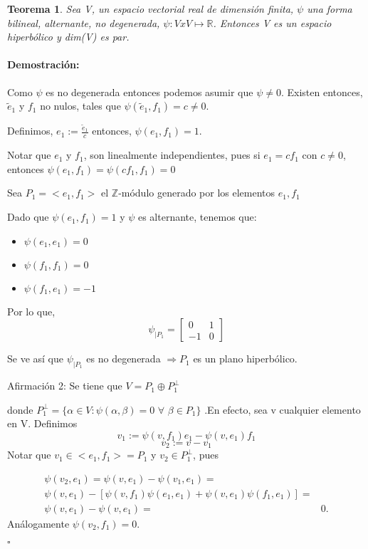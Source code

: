 \documentclass[12pt]{article}
\newtheorem{theorem}{Teorema}
\newenvironment{proof}{\paragraph{Demostración:}}{\hfill$\square$}
\begin{document}
\begin{theorem} \label{Lang-8.1}
 Sea V, un espacio vectorial real de dimensión finita, $\psi$ una forma bilineal, alternante, no degenerada, 
 $\psi:VxV\mapsto \mathbb{R}$. Entonces V es un espacio hiperbólico y dim(V) es par.
\end{theorem}

\begin{proof}
Como $\psi$ es no degenerada entonces podemos asumir que $\psi \neq 0$.
Existen entonces, $\tilde{e}_1$ y $f_1$ no nulos, tales que $\psi(\tilde{e}_1,f_1)=c\neq0$.

Definimos, $e_1:=\frac{\tilde{e}_1}{c}$ entonces, $\psi(e_1,f_1)=1$.

Notar que $e_1$ y $f_1$, son linealmente independientes, pues si $e_1=c f_1$ con $c\neq 0$,
entonces $\psi(e_1,f_1)=\psi(c f_1,f_1)=0$


Sea $P_1=<e_1,f_1>$ el $\mathbb{Z}$-módulo generado por los elementos $e_1,f_1$
    
Dado que $\psi(e_1,f_1)=1$ y $\psi$ es alternante, tenemos que:
\begin{itemize}
 \item $\psi(e_1,e_1)=0$
 \item $\psi(f_1,f_1)=0$
 \item $\psi(f_1,e_1)=-1$
\end{itemize}

Por lo que, 
$$\psi_{|P_1} = 
\begin{bmatrix}
 0 & 1\\ 
 -1& 0
\end{bmatrix}
$$

Se ve así que $\psi_{|P_1}$ es no degenerada $\Rightarrow P_1$ es un plano hiperbólico.
\newline

Afirmación 2: Se tiene que  $V = P_1 \oplus P_1^{\bot}$

 donde $P_1^{\bot}= \{ \alpha \in V: \psi(\alpha,\beta)=0$  $\forall$  $\beta \in P_1 \} $ .En efecto,  
 sea v cualquier elemento en V.
 Definimos 
 $$v_1:=\psi(v,f_1)e_1-\psi(v,e_1)f_1$$
 $$v_2:=v-v_1$$
 Notar que $v_1 \in <e_1,f_1>=P_1$ y $v_2 \in P_1^{\bot}$, pues 
 
 $$\begin{aligned}
 \psi(v_2,e_1)=\psi(v,e_1)-\psi(v_1,e_1)=&\\
 \psi (v,e_1)-[\psi(v,f_1) \psi(e_1,e_1) + \psi(v,e_1) \psi(f_1,e_1)]=&\\
 \psi(v,e_1)- \psi(v,e_1)=&0.
 \end{aligned}$$
 Análogamente $\psi(v_2,f_1)=0$.
 

\end{proof}
\end{document}
